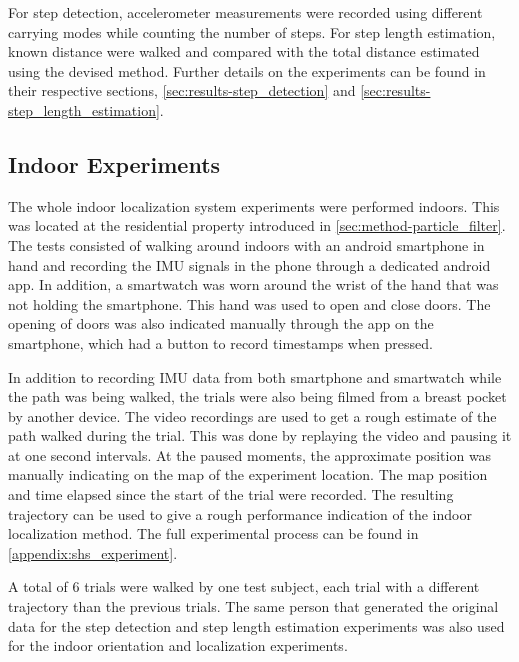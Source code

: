 For step detection, accelerometer measurements were recorded using different carrying modes while counting the number of steps. For step length estimation, known distance were walked and compared with the total distance estimated using the devised method. Further details on the experiments can be found in their respective sections, \cref{sec:results-step_detection} and \cref{sec:results-step_length_estimation}.    \par

\subsection{Indoor Experiments}
\label{sec:results-experi_setup-indoor_experi}
The whole indoor localization system experiments were performed indoors. This was located at the residential property introduced in \cref{sec:method-particle_filter}. The tests consisted of walking around indoors with an android smartphone in hand and recording the \ac{IMU} signals in the phone through a dedicated android app. In addition, a smartwatch was worn around the wrist of the hand that was not holding the smartphone. This hand was used to open and close doors. The opening of doors was also indicated manually through the app on the smartphone, which had a button to record timestamps when pressed.\par 

In addition to recording \ac{IMU} data from both smartphone and smartwatch while the path was being walked, the trials were also being filmed from a breast pocket by another device. The video recordings are used to get a rough estimate of the path walked during the trial. This was done by replaying the video and pausing it at one second intervals. At the paused moments, the approximate position was manually indicating on the map of the experiment location. The map position and time elapsed since the start of the trial were recorded. The resulting trajectory can be used to give a rough performance indication of the indoor localization method. The full experimental process can be found in \cref{appendix:shs_experiment}. \par

A total of 6 trials were walked by one test subject, each trial with a different trajectory than the previous trials. The same person that generated the original data for the step detection and step length estimation experiments was also used for the indoor orientation and localization experiments.\par 


